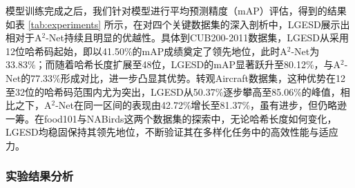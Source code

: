 模型训练完成之后，我们针对模型进行平均预测精度（mAP）评估，得到的结果如表 \ref{tab:experiments} 所示，在对四个关键数据集的深入剖析中，LGESD展示出相对于A${}^2$-Net持续且明显的优越性。具体到CUB200-2011数据集，LGESD从采用12位哈希码起始，即以41.50\%的mAP成绩奠定了领先地位，此时A${}^2$-Net为33.83\%；而随着哈希长度扩展至48位，LGESD的mAP显著跃升至80.12\%，与A${}^2$-Net的77.33\%形成对比，进一步凸显其优势。转观Aircraft数据集，这种优势在12至32位的哈希码范围内尤为突出，LGESD从50.37\%逐步攀高至85.06\%的峰值，相比之下，A${}^2$-Net在同一区间的表现由42.72\%增长至81.37\%，虽有进步，但仍略逊一筹。在food101与NABirds这两个数据集的探索中，无论哈希长度如何变化，LGESD均稳固保持其领先地位，不断验证其在多样化任务中的高效性能与适应力。


\subsubsection{实验结果分析}

